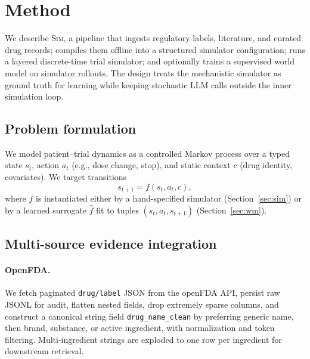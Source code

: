 %
% 

\section{Method}
\label{sec:method}

We describe \textsc{Sim}, a pipeline that ingests regulatory labels, literature, and curated drug records; compiles them offline into a structured simulator configuration; runs a layered discrete-time trial simulator; and optionally trains a supervised world model on simulator rollouts. The design treats the mechanistic simulator as ground truth for learning while keeping stochastic LLM calls outside the inner simulation loop.

\subsection{Problem formulation}
We model patient--trial dynamics as a controlled Markov process over a typed state $s_t$, action $a_t$ (e.g., dose change, stop), and static context $c$ (drug identity, covariates). We target transitions
\begin{equation}
  s_{t+1} = f(s_t, a_t, c),
\end{equation}
where $f$ is instantiated either by a hand-specified simulator (Section~\ref{sec:sim}) or by a learned surrogate $\hat{f}$ fit to tuples $(s_t,a_t,s_{t+1})$ (Section~\ref{sec:wm}).

\subsection{Multi-source evidence integration}
\label{sec:data}

\paragraph{OpenFDA.}
We fetch paginated \texttt{drug/label} JSON from the openFDA API, persist raw JSONL for audit, flatten nested fields, drop extremely sparse columns, and construct a canonical string field \texttt{drug\_name\_clean} by preferring generic name, then brand, substance, or active ingredient, with normalization and token filtering. Multi-ingredient strings are exploded to one row per ingredient for downstream retrieval.

